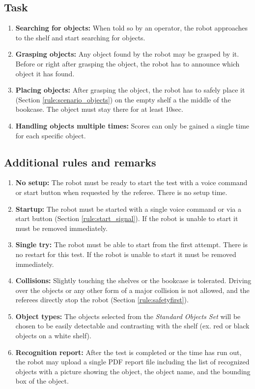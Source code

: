 \subsection{Task}
\begin{enumerate}
\item \textbf{Searching for objects:} When told so by an operator, the robot approaches to the shelf and start searching for objects.
\item \textbf{Grasping objects:} Any object found by the robot may be grasped by it. Before or right after grasping the object, the robot has to announce which object it has found.
\item \textbf{Placing objects:} After grasping the object, the robot has to safely place it (Section \ref{rule:scenario_objects}) on the empty shelf a the middle of the bookcase. The object must stay there for at least 10sec.
\item \textbf{Handling objects multiple times:} Scores can only be gained a single time for each specific object.
\end{enumerate}

\subsection{Additional rules and remarks}
\begin{enumerate}
\item \textbf{No setup:} The robot must be ready to start the test with a voice command or start button when requested by the referee. There is no setup time.
\item \textbf{Startup:} The robot must be started with a single voice command or via a start button (Section \ref{rule:start_signal}). If the robot is unable to start it must be removed immediately.
\item \textbf{Single try:} The robot must be able to start from the first attempt. There is no restart for this test. If the robot is unable to start it must be removed immediately.
\item \textbf{Collisions:} Slightly touching the shelves or the bookcase is tolerated. Driving over the objects or any other form of a major collision is not allowed, and the referees directly stop the robot (Section \ref{rule:safetyfirst}).
\item \textbf{Object types:} The objects selected from the \textit{Standard Objects Set} will be chosen to be easily detectable and contrasting with the shelf (ex. red or black objects on a white shelf).
\item \textbf{Recognition report:} After the test is completed or the time has run out, the robot may upload a single PDF report file including the list of recognized objects with a picture showing the object, the object name, and the bounding box of the object.
\end{enumerate}

